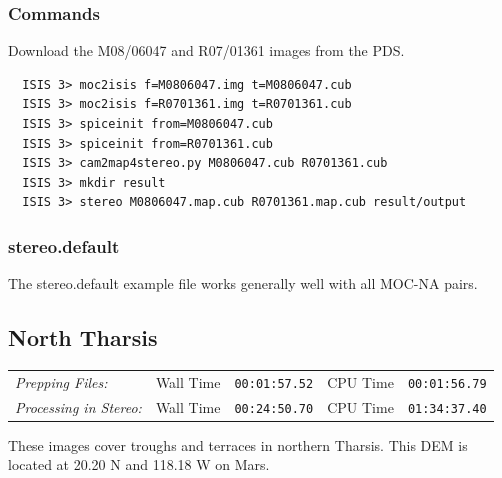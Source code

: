 \subsubsection*{Commands}

Download the M08/06047 and R07/01361 images from the \ac{PDS}.

\begin{verbatim}
  ISIS 3> moc2isis f=M0806047.img t=M0806047.cub
  ISIS 3> moc2isis f=R0701361.img t=R0701361.cub
  ISIS 3> spiceinit from=M0806047.cub
  ISIS 3> spiceinit from=R0701361.cub
  ISIS 3> cam2map4stereo.py M0806047.cub R0701361.cub
  ISIS 3> mkdir result
  ISIS 3> stereo M0806047.map.cub R0701361.map.cub result/output
\end{verbatim}

\subsubsection*{stereo.default}

The stereo.default example file works generally well with all MOC-NA pairs.

\pagebreak
\subsection{North Tharsis}

\begin{tabular}{l r c r c}
\textit{Prepping Files:}       & Wall Time & \texttt{00:01:57.52} & CPU Time & \texttt{00:01:56.79} \\
\textit{Processing in Stereo:} & Wall Time & \texttt{00:24:50.70} & CPU Time & \texttt{01:34:37.40} \\
\end{tabular}

These images cover troughs and terraces in northern Tharsis.
This \ac{DEM} is located at 20.20 N and 118.18 W on Mars.


